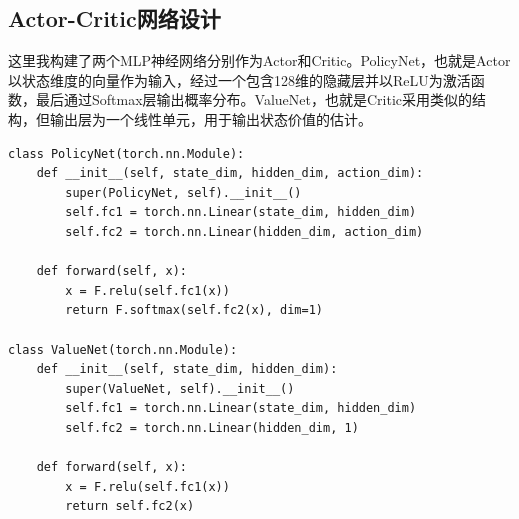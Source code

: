 \documentclass[11pt]{article}
\begin{document}
    \subsection{Actor-Critic网络设计}
    这里我构建了两个MLP神经网络分别作为Actor和Critic。PolicyNet，也就是Actor以状态维度的向量作为输入，经过一个包含128维的隐藏层并以ReLU为激活函数，最后通过Softmax层输出概率分布。ValueNet，也就是Critic采用类似的结构，但输出层为一个线性单元，用于输出状态价值的估计。
    \begin{lstlisting}
class PolicyNet(torch.nn.Module):
    def __init__(self, state_dim, hidden_dim, action_dim):
        super(PolicyNet, self).__init__()
        self.fc1 = torch.nn.Linear(state_dim, hidden_dim)
        self.fc2 = torch.nn.Linear(hidden_dim, action_dim)

    def forward(self, x):
        x = F.relu(self.fc1(x))
        return F.softmax(self.fc2(x), dim=1)

class ValueNet(torch.nn.Module):
    def __init__(self, state_dim, hidden_dim):
        super(ValueNet, self).__init__()
        self.fc1 = torch.nn.Linear(state_dim, hidden_dim)
        self.fc2 = torch.nn.Linear(hidden_dim, 1)

    def forward(self, x):
        x = F.relu(self.fc1(x))
        return self.fc2(x)
    \end{lstlisting}
\end{document}
